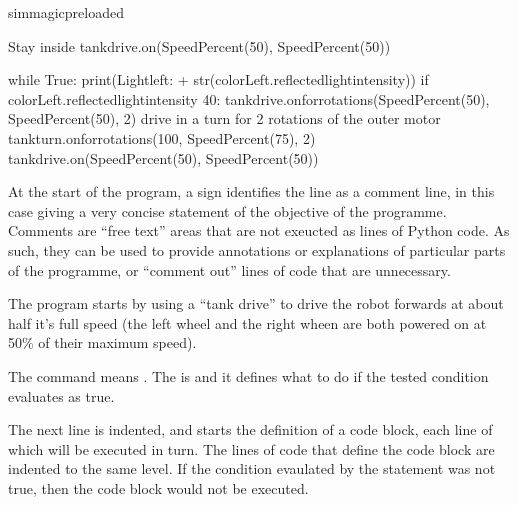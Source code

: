 \documentclass[letterpaper,10pt,english]{sphinxmanual}
\begin{document}
{
\begin{sphinxVerbatim}[commandchars=\\\{\}]
\llap{\color{nbsphinxin}[ ]:\,\hspace{\fboxrule}\hspace{\fboxsep}}\PYGZpc{}\PYGZpc{}sim\PYGZus{}magic\PYGZus{}preloaded

\PYGZsh{} Stay inside
tank\PYGZus{}drive.on(SpeedPercent(50), SpeedPercent(50))

while True:
    print(\PYGZsq{}Light\PYGZus{}left: \PYGZsq{} + str(colorLeft.reflected\PYGZus{}light\PYGZus{}intensity))
    if colorLeft.reflected\PYGZus{}light\PYGZus{}intensity \PYGZlt{} 40:
        tank\PYGZus{}drive.on\PYGZus{}for\PYGZus{}rotations(SpeedPercent(\PYGZhy{}50), SpeedPercent(\PYGZhy{}50), 2)
        \PYGZsh{} drive in a turn for 2 rotations of the outer motor
        tank\PYGZus{}turn.on\PYGZus{}for\PYGZus{}rotations(\PYGZhy{}100, SpeedPercent(75), 2)
        tank\PYGZus{}drive.on(SpeedPercent(50), SpeedPercent(50))
\end{sphinxVerbatim}
}

At the start of the program, a \sphinxcode{\sphinxupquote{\#}} sign identifies the line as a comment line, in this case giving a very concise statement of the objective of the programme. Comments are “free text” areas that are not exeucted as lines of Python code. As such, they can be used to provide annotations or explanations of particular parts of the programme, or “comment out” lines of code that are unnecessary.

The program starts by using a “tank drive” to drive the robot forwards at about half it’s full speed (the left wheel and the right wheen are both powered on at 50\% of their maximum speed).

The  command means . The \sphinxcode{\sphinxupquote{:}} is  and it defines what to do if the tested condition evaluates as true.

The next line is indented, and starts the definition of a code block, each line of which will be executed in turn. The lines of code that define the code block are indented to the same level. If the condition evaulated by the  statement was not true, then the code block would not be executed.
\end{document}

